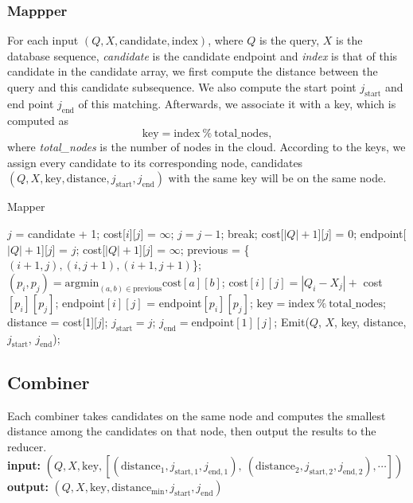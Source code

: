 \documentclass{article}
\begin{document}
\subsubsection*{Mappper}
For each input $(Q, X, \mathrm{candidate}, \mathrm{index})$, where $Q$ is the query, $X$ is the database sequence, \emph{candidate} is the candidate endpoint and \emph{index} is that of this candidate in the candidate array, we first compute the distance between the query and this candidate subsequence. We also compute the start point $j_{\mathrm{start}}$ and end point $j_{\mathrm{end}}$ of this matching. Afterwards, we associate it with a key, which is computed as $$\mathrm{key} = \mathrm{index}\ \%\ \mathrm{total\_nodes},$$ where \emph{total\_nodes} is the number of nodes in the cloud. According to the keys, we assign every candidate to its corresponding node, candidates $(Q, X, \mathrm{key}, \mathrm{distance}, j_{\mathrm{start}}, j_{\mathrm{end}})$ with the same key will be on the same node. \par

\begin{algorithm}
	\caption{Mapper}
	\begin{algorithmic}[1]
	\State $j$ = candidate + 1;
		\State cost[$i$][$j$] = $\infty$;
	\EndFor
		\State $j = j - 1$;
			\State break;
		\EndIf
			\State cost[$|Q|+1$][$j$] = 0;
			\State endpoint[$|Q|+1$][$j$] = $j$;
		\Else
			\State cost[$|Q|+1$][$j$] = $\infty$;
		\EndIf
			\State previous = \{$(i+1, j), (i, j+1), (i+1, j+1)$\};
			\State $(p_i, p_j) = \mathrm{argmin}_{(a,b)\in\mathrm{previous}}\mathrm{cost}[a][b]$;
			\State cost$[i][j] = |Q_i - X_j| +$ cost$[p_i][p_j]$;
			\State endpoint$[i][j]$ = endpoint$[p_i][p_j]$;
		\EndFor
	\EndWhile
	\State $\mathrm{key} = \mathrm{index}\ \%\ \mathrm{total\_nodes}$;
	\State distance = cost[1][$j$];
	\State $j_{\mathrm{start}} = j$;
	\State $j_{\mathrm{end}} = \mathrm{endpoint}[1][j]$;
	\State Emit($Q$, $X$, key, distance, $j_{\mathrm{start}}$, $j_{\mathrm{end}}$);
	\end{algorithmic}
\end{algorithm}

\subsection*{Combiner}
Each combiner takes candidates on the same node and computes the smallest distance among the candidates on that node, then output the results to the reducer.\\
\textbf{input:} $(Q, X, \mathrm{key}, [(\mathrm{distance_1}, j_{\mathrm{start},1}, j_{\mathrm{end},1}),\ (\mathrm{distance_2}, j_{\mathrm{start},2}, j_{\mathrm{end},2}), \cdots])$ \\
\textbf{output:} $(Q, X, \mathrm{key}, \mathrm{distance_{min}}, j_{\mathrm{start}}, j_{\mathrm{end}})$ \par
\end{document}
